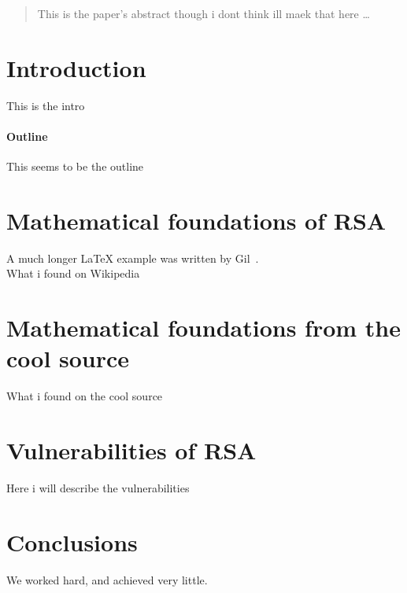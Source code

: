 \documentclass[12pt]{article}
\begin{document}
\maketitle

\begin{abstract}
This is the paper's abstract though i dont think ill maek that here \ldots
\end{abstract}

\section{Introduction}
This is the intro
\paragraph{Outline}
This seems to be the outline

\section{Mathematical foundations of RSA}\label{mathematical foundations of RSA}
A much longer \LaTeX{} example was written by Gil~\cite{Gil:02}.\\
What i found on Wikipedia

\section{Mathematical foundations from the cool source}\label{mathematical foundations from cool source}
What i found on the cool source

\section{Vulnerabilities of RSA}\label{vulnerabilities of RSA}
Here i will describe the vulnerabilities

\section{Conclusions}\label{conclusions}
We worked hard, and achieved very little.



\end{document}
